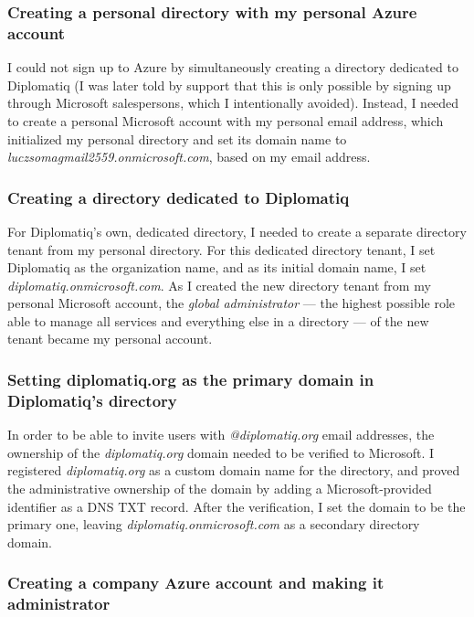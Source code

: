 \subsubsection{Creating a personal directory with my personal Azure account}

I could not sign up to Azure by simultaneously creating a directory dedicated to Diplomatiq (I was later told by support that this is only possible by signing up through Microsoft salespersons, which I intentionally avoided). Instead, I needed to create a personal Microsoft account with my personal email address, which initialized my personal directory and set its domain name to \emph{luczsomagmail2559.onmicrosoft.com}, based on my email address.

\subsubsection{Creating a directory dedicated to Diplomatiq}

For Diplomatiq's own, dedicated directory, I needed to create a separate directory tenant from my personal directory. For this dedicated directory tenant, I set Diplomatiq as the organization name, and as its initial domain name, I set \emph{diplomatiq.onmicrosoft.com}. As I created the new directory tenant from my personal Microsoft account, the \emph{global administrator} — the highest possible role able to manage all services and everything else in a directory — of the new tenant became my personal account.

\subsubsection{Setting diplomatiq.org as the primary domain in Diplomatiq's directory}

In order to be able to invite users with \emph{@diplomatiq.org} email addresses, the ownership of the \emph{diplomatiq.org} domain needed to be verified to Microsoft. I registered \emph{diplomatiq.org} as a custom domain name for the directory, and proved the administrative ownership of the domain by adding a Microsoft-provided identifier as a DNS TXT record. After the verification, I set the domain to be the primary one, leaving \emph{diplomatiq.onmicrosoft.com} as a secondary directory domain.

\subsubsection{Creating a company Azure account and making it administrator}

